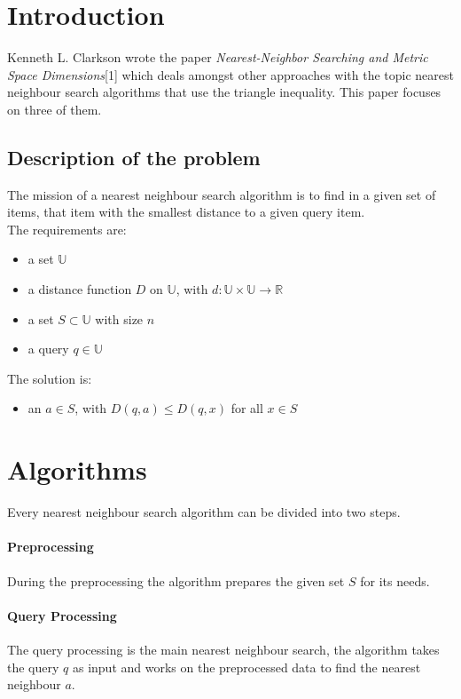 \documentclass[runningheads,a4paper]{llncs}
\begin{document}
\tableofcontents
{}

\newpage
{}

\section{Introduction}

Kenneth L. Clarkson wrote the paper \textit{Nearest-Neighbor Searching and Metric Space Dimensions}[1] which deals
amongst other approaches with the topic nearest neighbour search algorithms that use the triangle inequality. This paper
focuses on three of them.

\subsection{Description of the problem}

The mission of a nearest neighbour search algorithm is to find in a given set of items, that item with the smallest
distance to a given query item.\\
The requirements are:
\begin{itemize}
	\item a set $\mathbb{U}$
	\item a distance function $D$ on $\mathbb{U}$, with $d: \mathbb{U} \times \mathbb{U} \to \mathbb{R}$
	\item a set $S \subset \mathbb{U}$ with size $n$
	\item a query $q \in \mathbb{U}$
\end{itemize}
The solution is:
\begin{itemize}
	\item an $a \in S$, with $D(q, a) \le D(q, x)$ for all $x \in S$
\end{itemize}

\section{Algorithms}

Every nearest neighbour search algorithm can be divided into two steps.
\paragraph{Preprocessing}
During the preprocessing the algorithm prepares the given set $S$ for its needs.

\paragraph{Query Processing}
The query processing is the main nearest neighbour search, the algorithm takes the query $q$ as input and works on the
preprocessed data to find the nearest neighbour $a$.\\
\end{document}
